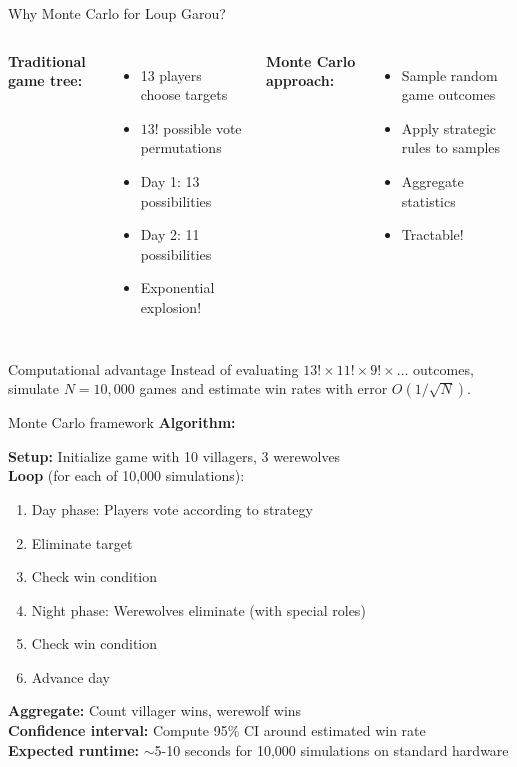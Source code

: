 \documentclass[10pt]{beamer}
\begin{document}
\begin{frame}{Why Monte Carlo for Loup Garou?}
  \begin{columns}[T]
    \textbf{Traditional game tree:}
    \begin{itemize}
      \item 13 players choose targets
      \item $13!$ possible vote permutations
      \item Day 1: 13 possibilities
      \item Day 2: 11 possibilities
      \item \alert{Exponential explosion!}
    \end{itemize}
    
    \textbf{Monte Carlo approach:}
    \begin{itemize}
      \item Sample random game outcomes
      \item Apply strategic rules to samples
      \item Aggregate statistics
      \item {Tractable!}
    \end{itemize}
  \end{columns}

  \vspace{0.5cm}
  \begin{alertblock}{Computational advantage}
    Instead of evaluating $13! \times 11! \times 9! \times \ldots$ outcomes, simulate $N = 10,000$ games and estimate win rates with error $O(1/\sqrt{N})$.
  \end{alertblock}
\end{frame}

\begin{frame}{Monte Carlo framework}
  \textbf{Algorithm:}
  
  \textbf{Setup:} Initialize game with 10 villagers, 3 werewolves \\
  \textbf{Loop} (for each of 10,000 simulations): \\
      \begin{enumerate}
        \item Day phase: Players vote according to strategy
        \item Eliminate target
        \item Check win condition
        \item Night phase: Werewolves eliminate (with special roles)
        \item Check win condition
        \item Advance day
      \end{enumerate}
  \textbf{Aggregate:} Count villager wins, werewolf wins \\
  \textbf{Confidence interval:} Compute 95\% CI around estimated win rate \\
  \textbf{Expected runtime:} $\sim$5-10 seconds for 10,000 simulations on standard hardware \\
\end{frame}
\end{document}
